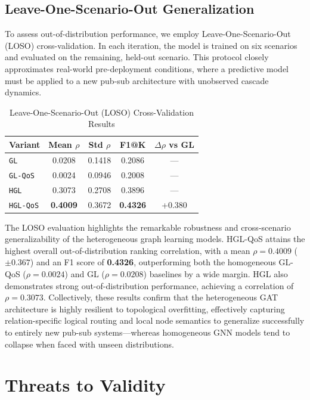 \documentclass[sigconf,9pt,anonymous]{acmart}
\begin{document}
\subsection{Leave-One-Scenario-Out Generalization}

To assess out-of-distribution performance, we employ Leave-One-Scenario-Out (LOSO) cross-validation. In each iteration, the model is trained on six scenarios and evaluated on the remaining, held-out scenario. This protocol closely approximates real-world pre-deployment conditions, where a predictive model must be applied to a new pub-sub architecture with unobserved cascade dynamics.

\begin{table}[t]
\centering
\caption{Leave-One-Scenario-Out (LOSO) Cross-Validation Results}
\label{tab:loso_sweep}
\begin{tabular}{l c c c c}
\toprule
\textbf{Variant} & \textbf{Mean $\rho$} & \textbf{Std $\rho$} & \textbf{F1@K} & \textbf{$\Delta\rho$ vs GL} \\
\midrule
\texttt{GL} & 0.0208 & 0.1418 & 0.2086 & — \\
\texttt{GL-QoS} & 0.0024 & 0.0946 & 0.2008 & — \\
\texttt{HGL} & 0.3073 & 0.2708 & 0.3896 & — \\
\texttt{HGL-QoS} & \textbf{0.4009} & 0.3672 & \textbf{0.4326} & +0.380 \\
\bottomrule
\end{tabular}
\end{table}

The LOSO evaluation highlights the remarkable robustness and cross-scenario generalizability of the heterogeneous graph learning models. HGL-QoS attains the highest overall out-of-distribution ranking correlation, with a mean $\rho = 0.4009$ ($\pm 0.367$) and an F1 score of \textbf{0.4326}, outperforming both the homogeneous GL-QoS ($\rho = 0.0024$) and GL ($\rho = 0.0208$) baselines by a wide margin. HGL also demonstrates strong out-of-distribution performance, achieving a correlation of $\rho = 0.3073$. Collectively, these results confirm that the heterogeneous GAT architecture is highly resilient to topological overfitting, effectively capturing relation-specific logical routing and local node semantics to generalize successfully to entirely new pub-sub systems—whereas homogeneous GNN models tend to collapse when faced with unseen distributions.

\section{Threats to Validity}
\end{document}
